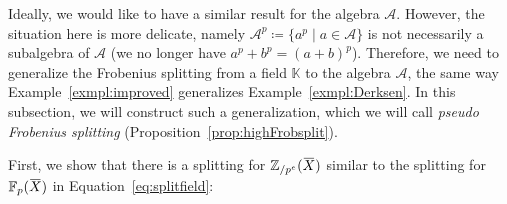\documentclass[letterpaper, 11pt, thm-restate]{article}
\numberwithin{equation}{section}
\newcommand{\N}{\mathbb{N}}
\newcommand{\K}{\mathbb{K}}
\newcommand{\F}{\mathbb{F}}
\newcommand{\Zpe}{\mathbb{Z}_{/p^e}}
\newcommand{\Zpi}{\mathbb{Z}_{/p^i}}
\newcommand{\mP}{\mathcal{P}}
\newcommand{\mA}{\mathcal{A}}
\newcommand{\mR}{\mathcal{R}}
\newcommand{\red}{\textcolor{red}}
\newcommand{\oX}{\mkern 1.5mu\overline{\mkern-1.5mu X \mkern-1.5mu}\mkern 1.5mu}
\newtheorem{lem}[thrm]{Lemma}
\theoremstyle{definition}
\theoremstyle{definition}
\theoremstyle{definition}
\begin{document}
Ideally, we would like to have a similar result for the algebra $\mA$.
However, the situation here is more delicate, namely $\mA^p \coloneqq \{a^p \mid a \in \mA\}$ is not necessarily a subalgebra of $\mA$ (we no longer have $a^p + b^p = (a+b)^p$).
Therefore, we need to generalize the Frobenius splitting from a field $\K$ to the algebra $\mA$, the same way Example~\ref{exmpl:improved} generalizes Example~\ref{exmpl:Derksen}.
In this subsection, we will construct such a generalization, which we will call \emph{pseudo Frobenius splitting} (Proposition~\ref{prop:highFrobsplit}).


%    
%

First, we show that there is a splitting for $\Zpe(\oX)$ similar to the splitting for $\F_p(\oX)$ in Equation~\eqref{eq:splitfield}:
\end{document}
